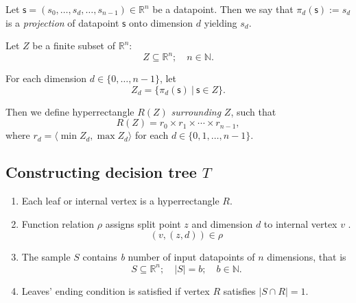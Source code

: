 
\begin{definition}
Let $\mathsf{s}=(s_0, \dots, s_d, \dots, s_{n-1})\in \mathbb{R}^n$ be a datapoint. Then we say that $\pi_d(\mathsf{s}):=s_d$ is a \emph{projection} of datapoint $\mathsf{s}$ onto dimension $d$  yielding $s_d$.
\end{definition}

\begin{definition}
Let $Z$ be a finite subset of $\mathbb{R}^n$:
$$Z \subseteq \mathbb{R}^n ;\quad n \in \mathbb{N}.$$

For each dimension \(d \in\{0, \dots, n - 1\}\), let
$$Z_d = \{ \pi_d(\mathsf{s})\ |\ \mathsf{s} \in Z \}.$$

Then we define hyperrectangle $R(Z)$ \emph{surrounding} $Z$, such that
$$R(Z) = r_0 \times r_1 \times \cdots \times r_{n-1},$$ where $r_d = \langle \min Z_d, \max Z_d \rangle$ for each $d \in \{0,1, \dots, n-1\}.$

\end{definition}


\subsection{Constructing decision tree $T$}

\begin{enumerate}

    \item Each leaf or internal vertex is a hyperrectangle $R$. 
    \item Function relation $\rho$ assigns split point $z$ and dimension $d$ to internal vertex $v$ .
    $$(v, (z,d)) \in \rho$$
    \item The sample \(S\) contains \emph{b} number of input datapoints of $n$ dimensions, that is
    $$S \subseteq \mathbb{R}^n ;\quad |S| = b; \quad b \in \mathbb{N}.$$
    \item Leaves' ending condition is satisfied if vertex \(R\) satisfies \(| S \cap R | = 1\).
\end{enumerate}


